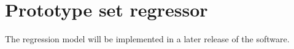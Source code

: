 \chapter{Prototype set regressor}
\label{ch_regressors}
%
The regression model will be implemented in a later release of the software.
\endinput
